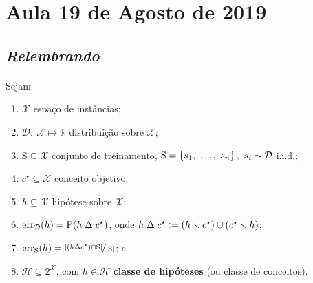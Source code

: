 { %

\newcommand{\given}{\,\middle|\,}               %

\newcommand{\Reals}{\mathds{R}}                 %

\newcommand{\defeq}{\vcentcolon=}               %
\newcommand{\eqdef}{=\vcentcolon}               %

\renewcommand{\l}{\mathopen{}\left}             %
\renewcommand{\r}{\vphantom{1j}\right}          %

\cleardoublepage
\section{Aula 19 de Agosto de 2019}
\label{2019_08_19}

\subsection*{\it Relembrando}

\paragraph{\nopunct} Sejam
\begin{enumerate}
  \item $\mathcal{X}$ espaço de instâncias;
  \item $\mathcal{D}\colon\ \mathcal{X}\mapsto\Reals$ distribuição sobre $\mathcal{X}$;
  \item $\mathrm{S}\subseteq\mathcal{X}$ conjunto de treinamento, $\mathrm{S}=\l\{s_1,\ \ldots,\ s_n\r\},\ s_i\sim\mathcal{D}$ i.i.d.;
  \item $c^\star\subseteq\mathcal{X}$ conceito objetivo;
  \item $h\subseteq\mathcal{X}$ hipótese sobre $\mathcal{X}$;
  \item $\mathrm{err}_\mathcal{D}\l(h\r)=\mathrm{P}\l(h\mathrel{\Delta}c^\star\r)$, onde $h\mathrel{\Delta}c^\star\defeq\l(h\setminus c^\star\r)\cup\l(c^\star\setminus h\r)$;
  \item $\mathrm{err}_\mathrm{S}\l(h\r)=\nicefrac{\l|\l(h\mathrel{\Delta}c^\star\r)\cap\mathrm{S}\r|}{\l|\mathrm{S}\r|}$; e
  \item $\mathcal{H}\subseteq 2^\mathcal{X}$, com $h\in\mathcal{H}$ \textbf{classe de hipóteses} (ou classe de conceitos).
\end{enumerate}

}
